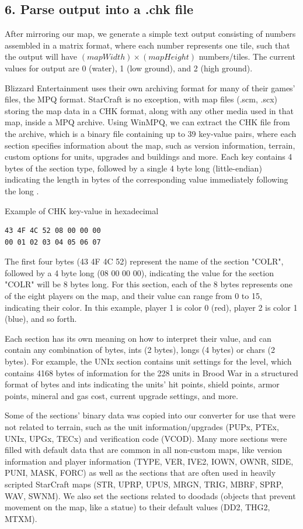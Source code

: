 \documentclass[letterpaper]{article}
\begin{document}
\subsection{6. Parse output into a .chk file}
After mirroring our map, we generate a simple text output consisting of numbers assembled in a matrix format, where each number represents one tile, such that the output will have $(mapWidth) \times (mapHeight)$ numbers/tiles. The current values for output are 0 (water), 1 (low ground), and 2 (high ground).

Blizzard Entertainment uses their own archiving format for many of their games' files, the MPQ format. StarCraft is no exception, with map files (.scm, .scx) storing the map data in a CHK format, along with any other media used in that map, inside a MPQ archive. Using WinMPQ, we can extract the CHK file from the archive, which is a binary file containing up to 39 key-value pairs, where each section specifies information about the map, such as version information, terrain, custom options for units, upgrades and buildings and more. Each key contains 4 bytes of the section type, followed by a single 4 byte long (little-endian) indicating the length in bytes of the corresponding value immediately following the long \cite{Olbrantz}.

Example of CHK key-value in hexadecimal
\begin{verbatim}
43 4F 4C 52 08 00 00 00
00 01 02 03 04 05 06 07
\end{verbatim}

The first four bytes (43 4F 4C 52) represent the name of the section "COLR", followed by a 4 byte long (08 00 00 00), indicating the value for the section "COLR" will be 8 bytes long. For this section, each of the 8 bytes represents one of the eight players on the map, and their value can range from 0 to 15, indicating their color. In this example, player 1 is color 0 (red), player 2 is color 1 (blue), and so forth.

Each section has its own meaning on how to interpret their value, and can contain any combination of bytes, ints (2 bytes), longs (4 bytes) or chars (2 bytes). For example, the UNIx section contains unit settings for the level, which contains 4168 bytes of information for the 228 units in Brood War in a structured format of bytes and ints indicating the units' hit points, shield points, armor points, mineral and gas cost, current upgrade settings, and more.

Some of the sections' binary data was copied into our converter for use that were not related to terrain, such as the unit information/upgrades (PUPx, PTEx, UNIx, UPGx, TECx) and verification code (VCOD). Many more sections were filled with default data that are common in all non-custom maps, like version information and player information (TYPE, VER, IVE2, IOWN, OWNR, SIDE, PUNI, MASK, FORC) as well as the sections that are often used in heavily scripted StarCraft maps (STR, UPRP, UPUS, MRGN, TRIG, MBRF, SPRP, WAV, SWNM). We also set the sections related to doodads (objects that prevent movement on the map, like a statue) to their default values (DD2, THG2, MTXM).
\end{document}
